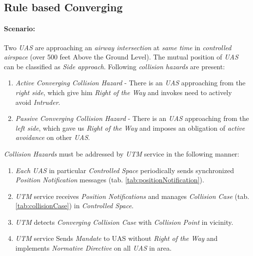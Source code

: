 \newpage
\subsection{Rule based Converging}\label{s:testRuleConverging}

\paragraph{Scenario:} Two \emph{UAS} are approaching an \emph{airway intersection} at \emph{same time} in \emph{controlled airspace} (over 500 feet Above the Ground Level). The mutual position of \emph{UAS} can be classified as \emph{Side approach}. Following \emph{collision hazards} are present:

\begin{enumerate}
    \item \emph{Active Converging Collision Hazard} -  There is an \emph{UAS} approaching from the \emph{right side}, which give him \emph{Right of the Way} and invokes need to actively avoid \emph{Intruder}.

	\item \emph{Passive Converging Collision Hazard} - There is an \emph{UAS} approaching from the \emph{left side}, which gave us \emph{Right of the Way} and imposes an obligation of \emph{active avoidance} on other \emph{UAS}.
	
\end{enumerate}


\noindent\emph{Collision Hazards} must be addressed by \emph{UTM} service in the following manner:


\begin{enumerate}
	\item \emph{Each UAS} in particular \emph{Controlled Space} periodically sends synchronized \emph{Position Notification} messages (tab. \ref{tab:positionNotification}). 
	
	\item \emph{UTM} service receives \emph{Position Notifications} and manages \emph{Collision Case} (tab. \ref{tab:collisionCase}) in \emph{Controlled Space}. 
	
	\item \emph{UTM} detects \emph{Converging Collision Case} with \emph{Collision Point} in  vicinity.
	
	\item \emph{UTM} service Sends \emph{Mandate} to UAS without \emph{Right of the Way} and implements \emph{Normative Directive} on all \emph{UAS} in area.
\end{enumerate}



